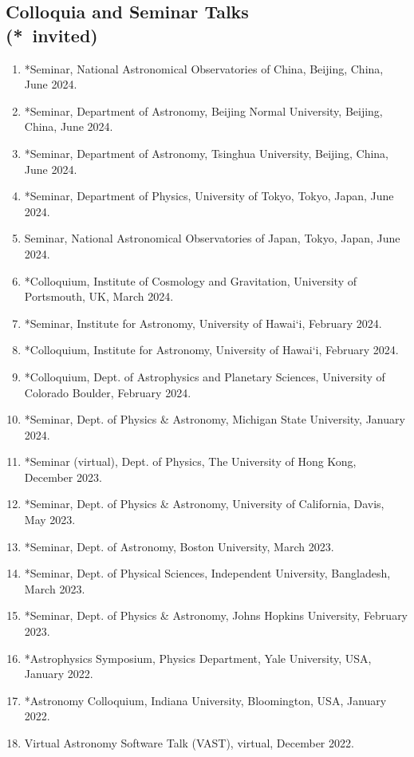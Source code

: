 \documentclass[margin, line]{res}
\begin{document}
\begin{resume}
\section{\sc Colloquia and Seminar Talks\\ ({*}\ invited)}
\begin{enumerate}
	\item *Seminar, National Astronomical Observatories of China, Beijing, China, June 2024.
	\item *Seminar, Department of Astronomy, Beijing Normal University, Beijing, China, June 2024.
	\item *Seminar, Department of Astronomy, Tsinghua University, Beijing, China, June 2024.
	\item *Seminar, Department of Physics, University of Tokyo, Tokyo, Japan, June 2024.
	\item Seminar, National Astronomical Observatories of Japan, Tokyo, Japan, June 2024.
	\item *Colloquium, Institute of Cosmology and Gravitation, University of Portsmouth, UK, March 2024.
	\item *Seminar, Institute for Astronomy, University of Hawai`i, February 2024. 
	\item *Colloquium, Institute for Astronomy, University of Hawai`i, February 2024. 
	\item *Colloquium, Dept. of Astrophysics and Planetary Sciences, University of Colorado Boulder, February 2024.
	\item *Seminar, Dept. of Physics \& Astronomy, Michigan State University, January 2024.
	\item *Seminar (virtual), Dept. of Physics, The University of Hong Kong, December 2023.
	\item *Seminar, Dept. of Physics \& Astronomy, University of California, Davis, May 2023.
	\item *Seminar, Dept. of Astronomy, Boston University, March 2023.
	\item *Seminar, Dept. of Physical Sciences, Independent University, Bangladesh, March 2023.
	\item {*}Seminar, Dept. of Physics \& Astronomy, Johns Hopkins University, February 2023.
	\item {*}Astrophysics Symposium, Physics Department, Yale University, USA, January 2022.
	\item {*}Astronomy Colloquium, Indiana University, Bloomington, USA, January 2022.
	\item Virtual Astronomy Software Talk (VAST), virtual, December 2022.

\end{enumerate}
\end{resume}
\end{document}
